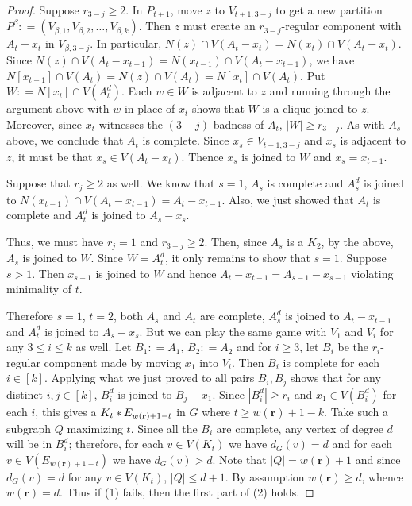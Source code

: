 \documentclass[12pt]{amsart}
\theoremstyle{plain}
\theoremstyle{definition}
\theoremstyle{remark}
\newcommand{\card}[1]{\left|#1\right|}
\newcommand{\irange}[1]{\left[#1\right]}
\newcommand{\join}[2]{#1 \mbox{\hspace{2 pt}$\ast$\hspace{2 pt}} #2}
\newcommand{\parens}[1]{\left( #1 \right)}
\newcommand{\DefinedAs}{\mathrel{\mathop:}=}
\newcommand{\mov}[2]{#1^{#2}}
\newcommand{\wt}[1]{w\parens{#1}}
\renewcommand{\vec}[1]{\mathbf{#1}}
\begin{document}
\begin{proof}
			Suppose $r_{3-j} \geq 2$.  In $P_{t+1}$, move $z$ to $V_{t+1, 3-j}$ to
			get a new partition $P^{\beta} \DefinedAs \parens{V_{\beta, 1},
			V_{\beta, 2}, \ldots, V_{\beta, k}}$. Then $z$ must create an
			$r_{3-j}$-regular component with $A_t - x_t$ in $V_{\beta, 3-j}$.  In
			particular, $N(z) \cap V(A_t - x_t) = N(x_t) \cap V(A_t - x_t)$.  Since $N(z)
			\cap V(A_t - x_{t-1}) = N(x_{t-1}) \cap V(A_t - x_{t-1})$, we have
			$N[x_{t-1}] \cap V(A_t) = N(z) \cap V(A_t) = N[x_t] \cap V(A_t)$.  Put $W
			\DefinedAs N[x_t] \cap V(\mov{A_t}{d})$. Each $w \in W$ is adjacent to $z$
			and running through the argument above with $w$ in place of $x_t$ shows
			that $W$ is a clique joined to $z$.  Moreover, since $x_t$ witnesses the
			$(3-j)$-badness of $A_t$, $\card{W} \geq r_{3-j}$.  As with $A_s$ above, we
			conclude that $A_t$ is complete.  Since $x_s \in V_{t+1, 3-j}$ and $x_s$ is
			adjacent to $z$, it must be that $x_s \in V(A_t - x_t)$.  Thence $x_s$ is
			joined to $W$ and $x_s = x_{t-1}$.  
			
			Suppose that $r_j \geq 2$ as well.  We know that $s = 1$, $A_s$ is
			complete and $\mov{A_s}{d}$ is joined to $N(x_{t-1}) \cap V(A_t - x_{t-1})
			= A_t - x_{t-1}$.  Also, we just showed that $A_t$ is complete and
			$\mov{A_t}{d}$ is joined to $A_s - x_s$.
						
			Thus, we must have $r_j = 1$ and $r_{3-j} \geq 2$.  Then,
			since $A_s$ is a $K_2$, by the above, $A_s$ is joined to $W$.  Since $W =
			\mov{A_t}{d}$, it only remains to show that $s=1$. Suppose $s > 1$.  Then
			$x_{s-1}$ is joined to $W$ and hence $A_t - x_{t-1} = A_{s - 1} - x_{s-1}$ violating minimality of $t$.
			
			Therefore $s = 1$, $t = 2$, both $A_s$ and $A_t$ are complete,
			$\mov{A_s}{d}$ is joined to $A_t - x_{t-1}$ and $\mov{A_t}{d}$ is joined to
			$A_s - x_s$.  But we can play the same game with $V_1$ and $V_i$ for any
			$3 \leq i \leq k$ as well.  Let $B_1 \DefinedAs A_1$, $B_2 \DefinedAs A_2$
			and for $i \geq 3$, let $B_i$ be the $r_i$-regular component made by moving
			$x_1$ into $V_i$.  Then $B_i$ is complete for each $i \in \irange{k}$. 
			Applying what we just proved to all pairs $B_i, B_j$ shows that for any
			distinct $i, j \in \irange{k}$, $\mov{B_i}{d}$ is joined to $B_j - x_1$. 
			Since $\card{\mov{B_i}{d}} \geq r_i$ and $x_1 \in V(\mov{B_i}{d})$ for each
			$i$, this gives a $\join{K_t}{E_{\wt{\vec{r}} + 1 - t}}$ in $G$ where $t \geq \wt{\vec{r}} + 1 -
			k$.  Take such a subgraph $Q$ maximizing $t$.  Since all the $B_i$ are
			complete, any vertex of degree $d$ will be in $\mov{B_i}{d}$; therefore, for each $v
			\in V(K_t)$ we have $d_G(v) = d$ and for each $v \in V(E_{\wt{\vec{r}}+1-t})$ we have $d_G(v) > d$.
			Note that $\card{Q} = \wt{\vec{r}}+1$ and since $d_G(v) = d$ for any $v \in V(K_t)$,
			$\card{Q} \leq d + 1$. By assumption $\wt{\vec{r}} \geq d$, whence $\wt{\vec{r}}=d$.  
			Thus if (1) fails, then	the first part of (2) holds.
			

\end{proof}
\end{document}
